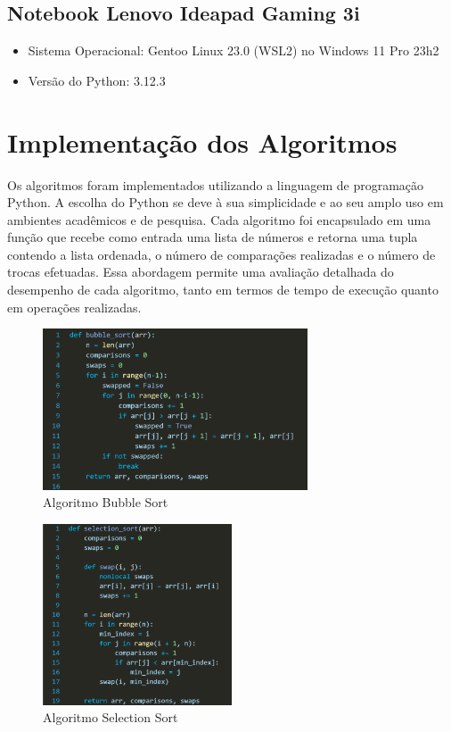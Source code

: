 \documentclass[tcc2]{uftex}
\begin{document}
\subsection{Notebook Lenovo Ideapad Gaming 3i}
\begin{itemize}[label=--]
    \item Sistema Operacional: Gentoo Linux 23.0 (WSL2) no Windows 11 Pro 23h2
    \item Versão do Python: 3.12.3
\end{itemize}


\section{Implementação dos Algoritmos}

Os algoritmos foram implementados utilizando a linguagem de programação Python. A escolha do Python se deve à sua simplicidade e ao seu amplo uso em ambientes acadêmicos e de pesquisa. 
Cada algoritmo foi encapsulado em uma função que recebe como entrada uma lista de números e retorna uma tupla contendo a lista ordenada, o número de comparações realizadas e o número de trocas efetuadas. Essa abordagem permite uma avaliação detalhada do desempenho de cada algoritmo, tanto em termos de tempo de execução quanto em operações realizadas.

\begin{figure}[h!]
    \centering
    \includegraphics[width=0.7\textwidth]{bubble_sort.png}  %
    \caption{Algoritmo Bubble Sort}
    \label{fig:exemplo}
\end{figure}

\begin{figure}[h!]
    \centering
    \includegraphics[width=0.5\textwidth]{selection_sort.png}  %
    \caption{Algoritmo Selection Sort}
    \label{fig:selection_sort}
\end{figure}
\end{document}
